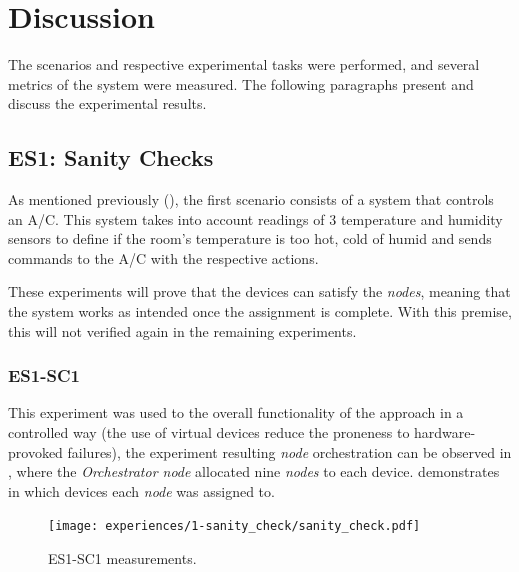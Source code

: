 \section{Discussion}\label{sec:evaluation_discussion}

The scenarios and respective experimental tasks were performed, and several metrics of the system were measured. The following paragraphs present and discuss the experimental results.

\subsection{ES1: Sanity Checks}\label{sec:discussion_scenario1}

As mentioned previously (\cf {}), the first scenario consists of a system that controls an A/C. This system takes into account readings of 3 temperature and humidity sensors to define if the room's temperature is too hot, cold of humid and sends commands to the A/C with the respective actions.

These experiments will prove that the devices can satisfy the \textit{nodes}, meaning that the system works as intended once the assignment is complete. With this premise, this will not verified again in the remaining experiments.


\subsubsection{ES1-SC1}\label{sec:sanity_check_exp}

This experiment was used to the overall functionality of the approach in a controlled way (the use of virtual devices reduce the proneness to hardware-provoked failures), the experiment resulting \textit{node} orchestration can be observed in , where the \textit{Orchestrator node} allocated nine \textit{nodes} to each device.  demonstrates in which devices each \textit{node} was assigned to.

\begin{figure}[h]
\centering
\texttt{[image: experiences/1-sanity\_check/sanity\_check.pdf]}
\caption[ES1-SC1 measurements.]{ES1-SC1 measurements.}\label{fig:sanity_check_graph}
\end{figure}

